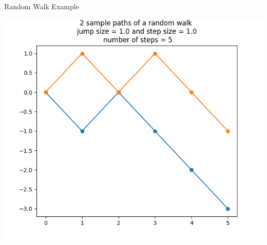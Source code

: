 \documentclass{beamer}%
\numberwithin{equation}{section}
\begin{document}
	
	
	\begin{frame}{Random Walk Example}
		\begin{center}
			\includegraphics[scale=.6]{randomwalk5steps.png}
		\end{center}
	\end{frame}
	
\end{document}
